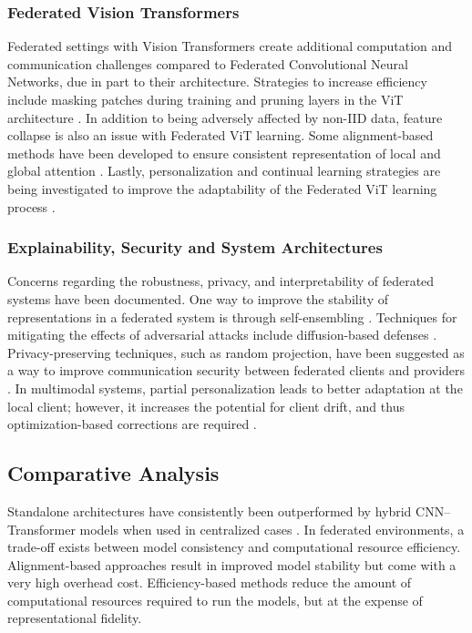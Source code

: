 \documentclass{ieeeaccess}
\begin{document}
\subsubsection{Federated Vision Transformers}
Federated settings with Vision Transformers create additional computation and communication challenges compared to Federated Convolutional Neural Networks, due in part to their architecture. Strategies to increase efficiency include masking patches during training \cite{Wu2024} and pruning layers in the ViT architecture \cite{Paxton2024}. In addition to being adversely affected by non-IID data, feature collapse is also an issue with Federated ViT learning. Some alignment-based methods have been developed to ensure consistent representation of local and global attention \cite{Darzi2024}. Lastly, personalization and continual learning strategies are being investigated to improve the adaptability of the Federated ViT learning process \cite{Zuo2024,Yao2024}.
\subsubsection{Explainability, Security and System Architectures}
Concerns regarding the robustness, privacy, and interpretability of federated systems have been documented. One way to improve the stability of representations in a federated system is through self-ensembling \cite{Almalik2022}. Techniques for mitigating the effects of adversarial attacks include diffusion-based defenses \cite{Imam2023}. Privacy-preserving techniques, such as random projection, have been suggested as a way to improve communication security between federated clients and providers \cite{Narimani2024}. In multimodal systems, partial personalization leads to better adaptation at the local client; however, it increases the potential for client drift, and thus optimization-based corrections are required \cite{Zhu2025}.
\subsection{Comparative Analysis}
Standalone architectures have consistently been outperformed by hybrid CNN–Transformer models when used in centralized cases \cite{Naeem2025,Alshdaifat2025}. In federated environments, a trade-off exists between model consistency and computational resource efficiency. Alignment-based approaches result in improved model stability but come with a very high overhead cost. Efficiency-based methods reduce the amount of computational resources required to run the models, but at the expense of representational fidelity.
\end{document}
